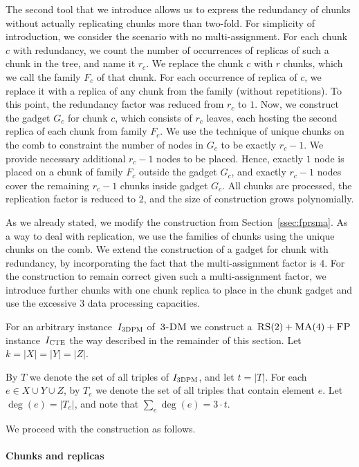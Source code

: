  The second tool that we introduce allows us to express the redundancy of chunks without actually replicating chunks more than two-fold.
For simplicity of introduction, we consider the scenario with no multi-assignment.
For each chunk $c$ with redundancy, we count the number of occurrences of replicas of such a chunk in the tree, and name it $r_c$.
We replace the chunk $c$ with $r$ chunks, which we call the family $F_c$ of that chunk.
For each occurrence of replica of $c$, we replace it with a replica of any chunk from the family (without repetitions).
To this point, the redundancy factor was reduced from $r_c$ to $1$.
Now, we construct the gadget $G_c$ for chunk $c$, which consists of $r_c$ leaves, each hosting the second replica of each chunk from family $F_c$.
We use the technique of unique chunks on the comb to constraint the number of nodes in $G_c$ to be exactly $r_c - 1$.
We provide necessary additional $r_c-1$ nodes to be placed.
Hence, exactly $1$ node is placed on a chunk of family $F_c$ outside the gadget $G_c$, and exactly $r_c-1$ nodes cover the remaining $r_c-1$ chunks inside gadget $G_c$.
All chunks are processed, the replication factor is reduced to $2$, and the size of construction grows polynomially.

 As we already stated, we modify the construction from Section~\ref{ssec:fprsma}.
As a way to deal with replication, we use the families of chunks using the unique chunks on the comb.
We extend the construction of a gadget for chunk with redundancy, by incorporating the fact that the multi-assignment factor is $4$.
For the construction to remain correct given such a multi-assignment factor, we introduce further chunks with one chunk replica to place in the chunk gadget and use the excessive $3$ data processing capacities.

 For an arbitrary instance~$I_{\mathrm{\textsc{3DPM}}}$ of~$\textsc{3-DM}$ we construct a~$\textsc{RS}(2)+\textsc{MA}(4)+\textsc{FP}$ instance~$I_{\mathrm{\textsc{CTE}}}$ the way described in the remainder of this section.
Let $k = |X|=|Y|=|Z|$.

By $T$ we denote the set of all triples of $I_{\mathrm{\textsc{3DPM}}}$, and let $t = |T|$.
For each $e\in X\cup Y\cup Z$, by $T_e$ we denote the set of all triples that contain element $e$.
Let $\deg(e) = |T_e|$, and note that $\sum_e \deg(e) = 3\cdot t$.

We proceed with the construction as follows.

\paragraph{Chunks and replicas}

